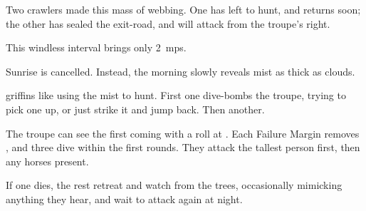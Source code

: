 \chitincrawler

Two \glspl{crawler} made this mass of webbing.
One has left to hunt, and returns soon; the other has sealed the exit-road, and will attack from the troupe's right.

This windless \gls{interval} brings only 2~\glspl{mp}.

\else%

\begin{boxtext}
  Sunrise is cancelled.
  Instead, the morning slowly reveals mist as thick as clouds.
\end{boxtext}

\Glspl{griffin} like using the mist to hunt.
First one dive-bombs the troupe, trying to pick one up, or just strike it and jump back.
Then another.

\griffin

The troupe can see the first coming with a  roll at \tn[12].
Each Failure Margin removes , and three dive within the first \glspl{round}.
They attack the tallest person first, then any horses present.

If one dies, the rest retreat and watch from the trees, occasionally mimicking anything they hear, and wait to attack again at night.

\fi
